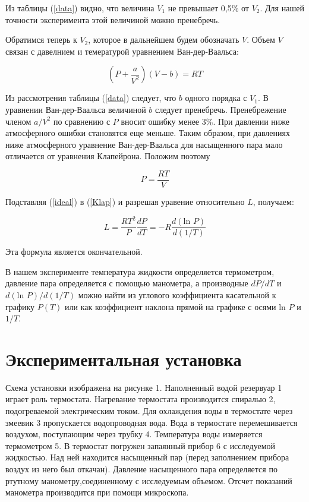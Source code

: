 \documentclass[a4paper,12pt]{article} %
\begin{document}
Из таблицы (\ref{data}) видно, что величина $V_1$ не превышает 0,5\%  от $V_2$. Для нашей точности эксперимента этой величиной можно пренебречь.

Обратимся теперь к $V_2$, которое в дальнейшем будем обозначать $V$. Объем $V$ связан с давелнием и темературой уравнением Ван-дер-Ваальса:

\begin{equation}
    \label{Van-der}
    \left( P + \frac{a}{V^2}\right)(V - b) = RT
\end{equation}
\break

Из рассмотрения таблицы (\ref{data}) следует, что $b$ одного порядка с $V_1$. В уравнении Ван-дер-Ваальса величиной $b$ следует пренебречь. Пренебрежение членом $a/V^2$ по сравнению с $P$ вносит ошибку менее 3\%. При давлении ниже атмосферного ошибки становятся еще меньше. Таким образом, при давлениях ниже атмосферного уравнение Ван-дер-Ваальса для насыщенного пара мало отличается от уравнения Клапейрона. Положим поэтому

\begin{equation}
    \label{ideal}
    P = \frac{RT}{V}
\end{equation}
\break

Подставляя (\ref{ideal}) в (\ref{Klap}) и разрешая уравение относительно $L$, получаем:

\begin{equation}
    \label{L}
    L = \frac{RT^2}{P}\frac{dP}{dT} = -R\frac{d(\mbox{ln }P)}{d(1/T)}
\end{equation}
\break

Эта формула является окончательной.

В нашем эксперименте температура жидкости определяется термометром, давление пара определяется с помощью манометра, а производные  $dP/dT$ и $d(\mbox{ln }P)/ d(1/T)$ можно найти из углового коэффициента касательной к графику  $P(T)$ или как коэффициент наклона прямой на графике с осями ln $P$ и $1/T$.

\section{Экспериментальная установка}

Схема установки изображена на рисунке 1. Наполненный водой резервуар 1 играет роль термостата. Нагревание термостата производится спиралью 2, подогреваемой электрическим током. Для охлаждения воды в термостате через змеевик 3 пропускается водопроводная вода. Вода в термостате перемешивается воздухом, поступающим через трубку 4. Температура воды измеряется термометром 5. В термостат погружен запаянный прибор 6 с исследуемой жидкостью. Над ней находится насыщенный пар (перед заполнением прибора воздух из него был откачан).
Давление насыщенного пара определяется по ртутному манометру,соединенному с исследуемым объемом. Отсчет показаний манометра производится при помощи микроскопа.
\end{document}

